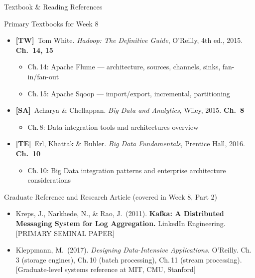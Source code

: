 \documentclass[aspectratio=169,10pt]{beamer}
\begin{document}
\begin{frame}{Textbook \& Reading References}
  \begin{block}{Primary Textbooks for Week 8}
    \begin{itemize}
      \item \textbf{[TW]}\ Tom White. \textit{Hadoop: The Definitive Guide}, O'Reilly, 4th ed., 2015.
            \hfill \textbf{Ch.\ 14, 15}
            \begin{itemize}
              \small\item Ch.\,14: Apache Flume — architecture, sources, channels, sinks, fan-in/fan-out
              \item Ch.\,15: Apache Sqoop — import/export, incremental, partitioning
            \end{itemize}
      \item \textbf{[SA]}\ Acharya \& Chellappan. \textit{Big Data and Analytics}, Wiley, 2015.
            \hfill \textbf{Ch.\ 8}
            \begin{itemize}
              \small\item Ch.\,8: Data integration tools and architectures overview
            \end{itemize}
      \item \textbf{[TE]}\ Erl, Khattak \& Buhler. \textit{Big Data Fundamentals}, Prentice Hall, 2016.
            \hfill \textbf{Ch.\ 10}
            \begin{itemize}
              \small\item Ch.\,10: Big Data integration patterns and enterprise architecture considerations
            \end{itemize}
    \end{itemize}
  \end{block}
  \vspace{4pt}
  \begin{exampleblock}{Graduate Reference and Research Article (covered in Week 8, Part 2)}
    \begin{itemize}
      \small
      \item Kreps, J., Narkhede, N., \& Rao, J.\ (2011). \textbf{Kafka: A Distributed Messaging System for Log Aggregation.} LinkedIn Engineering. [PRIMARY SEMINAL PAPER]
      \item Kleppmann, M.\ (2017). \textit{Designing Data-Intensive Applications.} O'Reilly. Ch.\,3 (storage engines), Ch.\,10 (batch processing), Ch.\,11 (stream processing). [Graduate-level systems reference at MIT, CMU, Stanford]
    \end{itemize}
  \end{exampleblock}
\end{frame}
\end{document}
